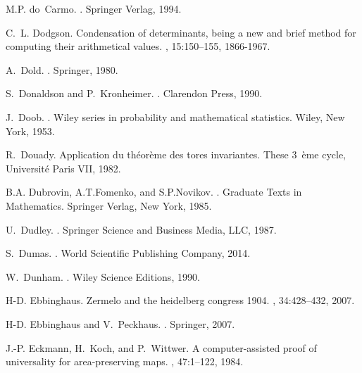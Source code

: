 \documentclass[12pt]{amsart}
\begin{document}
\begin{thebibliography}{100}
M.P. do~Carmo.
.
\newblock Springer Verlag, 1994.

C.~L. Dodgson.
\newblock Condensation of determinants, being a new and brief method for
  computing their arithmetical values.
, 15:150--155, 1866-1967.

A.~Dold.
.
\newblock Springer, 1980.

S.~Donaldson and P.~Kronheimer.
.
\newblock Clarendon Press, 1990.

J.~Doob.
.
\newblock Wiley series in probability and mathematical statistics. Wiley, New
  York, 1953.

R.~Douady.
\newblock Application du th\'eor\`eme des tores invariantes.
\newblock These {3~\`eme cycle, Universit\'e Paris VII}, 1982.

B.A. Dubrovin, A.T.Fomenko, and S.P.Novikov.
.
\newblock Graduate Texts in Mathematics. Springer Verlag, New York, 1985.

U.~Dudley.
.
\newblock Springer Science and Business Media, LLC, 1987.

S.~Dumas.
.
\newblock World Scientific Publishing Company, 2014.

W.~Dunham.
.
\newblock Wiley Science Editions, 1990.

H-D. Ebbinghaus.
\newblock Zermelo and the heidelberg congress 1904.
, 34:428--432, 2007.

H-D. Ebbinghaus and V.~Peckhaus.
.
\newblock Springer, 2007.

J.-P. Eckmann, H.~Koch, and P.~Wittwer.
\newblock A computer-assisted proof of universality for area-preserving maps.
, 47:1--122, 1984.


\end{thebibliography}
\end{document}
